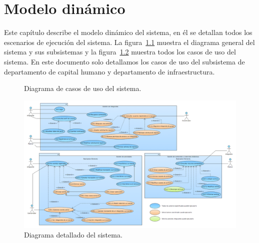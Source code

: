 \chapter{Modelo dinámico}	
\label{cap:modDinamico}

	Este capítulo describe el modelo dinámico del sistema, en él se detallan todos los escenarios de ejecución del sistema. La figura~\ref{fig:casosDeUso} muestra el diagrama general del sistema y sus subsistemas y la figura~\ref{fig:casosDeUsoDetalle} muestra todos los casos de uso del sistema. En este documento solo detallamos los casos de uso del subsistema de departamento de capital humano y departamento de infraestructura.
	
\begin{figure}[htbp]
	\begin{center}
		\caption{Diagrama de casos de uso del sistema.}
		\label{fig:casosDeUso}
	\end{center}
\end{figure}

\begin{figure}[htbp]
	\begin{center}
		\includegraphics[angle=90, width=.7\textwidth]{images/casosDeUsoDetalle}
		\caption{Diagrama detallado del sistema.}
		\label{fig:casosDeUsoDetalle}
	\end{center}
\end{figure}

